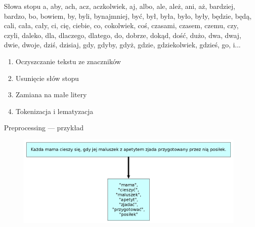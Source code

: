 \documentclass{beamer}
\begin{document}
	\begin{frame}{Słowa stopu}
		a, aby, ach, acz, aczkolwiek, aj, albo, ale, ależ, ani, aż, bardziej, bardzo, bo, bowiem, by, byli, bynajmniej, być, był, była, było, były, będzie, będą, cali, cała, cały, ci, cię, ciebie, co, cokolwiek, coś, czasami, czasem, czemu, czy, czyli, daleko, dla, dlaczego, dlatego, do, dobrze, dokąd, dość, dużo, dwa, dwaj, dwie, dwoje, dziś, dzisiaj, gdy, gdyby, gdyż, gdzie, gdziekolwiek, gdzieś, go, i...
	\end{frame}
	\begin{frame}
		\begin{enumerate}
			\item Oczyszczanie tekstu ze znaczników
			\item Usunięcie słów stopu
			\item Zamiana na małe litery
			\item Tokenizacja i lematyzacja %
		\end{enumerate}
	\end{frame}
	\begin{frame}{Preprocessing --- przykład}
		\begin{figure}
			\centering
			\includegraphics[width=1\textwidth]{img/lemmatisation.png}
		\end{figure}
	\end{frame}
\end{document}

